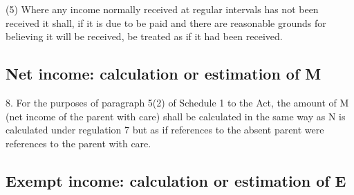 \documentclass[12pt,a4paper]{article}
\begin{document}
(5) Where any income normally received at regular intervals has not been received it shall, if it is due to be paid and there are reasonable grounds for believing it will be received, be treated as if it had been received.


\subsection[8. Net income: calculation or estimation of M]{Net income: calculation or estimation of M}

8.  For the purposes of paragraph 5(2) of Schedule 1 to the Act, the amount of M (net income of the parent with care) shall be calculated in the same way as N is calculated under regulation 7 but as if references to the absent parent were references to the parent with care.

\subsection[9. Exempt income: calculation or estimation of E]{Exempt income: calculation or estimation of E}
\end{document}
